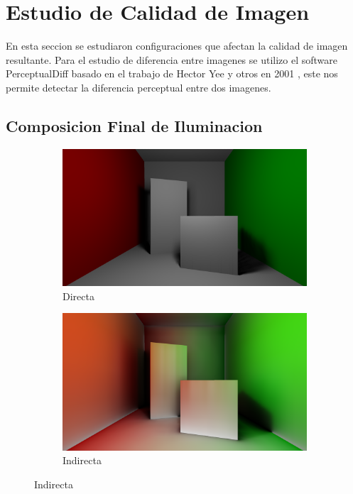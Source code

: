 \section{Estudio de Calidad de Imagen}

En esta seccion se estudiaron configuraciones que afectan la calidad de imagen resultante. Para el estudio de diferencia entre imagenes se utilizo el software PerceptualDiff basado en el trabajo de Hector Yee y otros en 2001 \cite{Yee:2001:SSV:383745.383748}, este nos permite detectar la diferencia perceptual entre dos imagenes.

\subsection{Composicion Final de Iluminacion}

\begin{figure}[H]
	\centering
	\begin{subfigure}[t]{.49\linewidth}
		\centering
		\captionsetup{justification=centering}
		\caption*{Directa}
		\includegraphics[width=\linewidth]{media/finals/cornell_direct.png}
	\end{subfigure}%
	\hspace{0.01\textwidth}
	\begin{subfigure}[t]{.49\linewidth}
		\centering
		\caption*{Indirecta}
		\captionsetup{justification=centering}
		\includegraphics[width=\linewidth]{media/finals/cornell_indirect.png}

\end{subfigure}
\end{figure}
